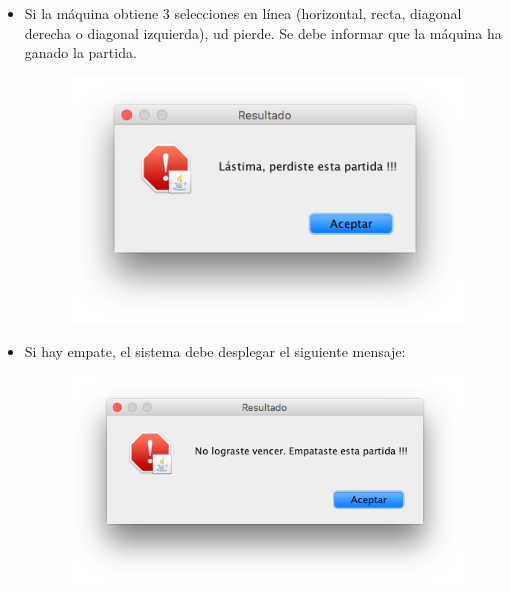 \documentclass[10pt]{article}
\begin{document}
{\begin{enumerate}
\begin{itemize}
    \item Si la m\'aquina obtiene 3 selecciones en l\'inea (horizontal, recta, diagonal derecha o diagonal izquierda), ud pierde. Se debe informar que la m\'aquina ha ganado la partida.
    
    \begin{figure}[H]
        \begin{center}
            \includegraphics[scale=.5]{img_msg_perdio.png}
        \end{center}
    \end{figure} 
    
    \item Si hay empate, el sistema debe desplegar el siguiente mensaje:
    
        \begin{figure}[H]
        \begin{center}
            \includegraphics[scale=.5]{img_msg_empate.png}
        \end{center}
    \end{figure}     
     
\end{itemize}

 \newpage

 

\end{enumerate}
}
\end{document}
